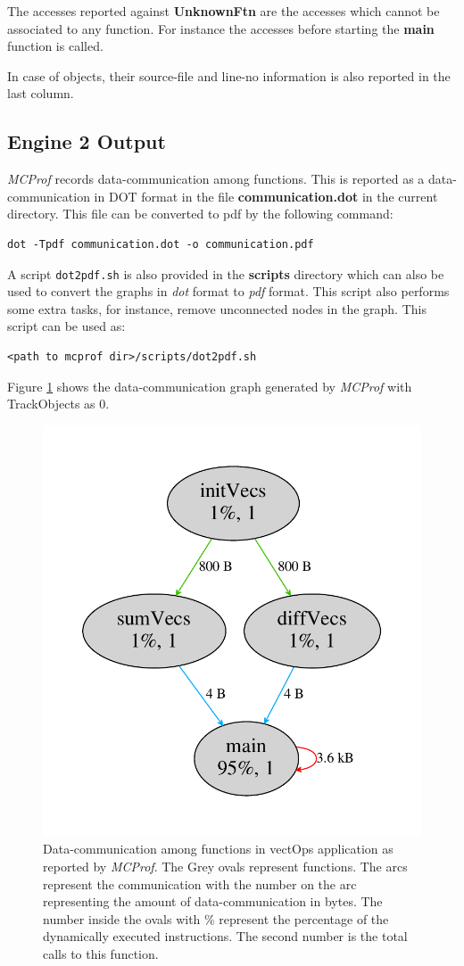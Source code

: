 \documentclass[11pt]{article}
\newcommand{\MCPROF}{\emph{MCProf}}
\begin{document}
The accesses reported against \textbf{UnknownFtn} are the accesses which cannot
be associated to any function. For instance the accesses before starting the
\textbf{main} function is called.

In case of objects, their source-file and line-no information is also reported in
the last column.

\subsection{Engine 2 Output}

\MCPROF{} records data-communication among functions. This is reported as a
data-communication in DOT format in the file \textbf{communication.dot} in the
current directory. This file can be converted to pdf by the following command:

{
\small
\begin{Verbatim}[frame=single]
dot -Tpdf communication.dot -o communication.pdf
\end{Verbatim}
}

A script \verb|dot2pdf.sh| is also provided in the \textbf{scripts} directory which can
also be used to convert the graphs in \emph{dot} format to \emph{pdf} format. This script
also performs some extra tasks, for instance, remove unconnected nodes in the
graph. This script can be used as:

{
\small
\begin{Verbatim}[frame=single]
<path to mcprof dir>/scripts/dot2pdf.sh
\end{Verbatim}
}

Figure \ref{fig:comm} shows the data-communication graph generated by \MCPROF{}
with TrackObjects as 0.

\begin{figure}[!h]
\centering
\includegraphics[width=0.55\linewidth]{figures/comm.pdf}
\caption{Data-communication among functions in vectOps application as reported
    by \MCPROF{}. The Grey ovals represent functions. The arcs represent the
    communication with the number on the arc representing the amount of
    data-communication in bytes. The number inside the ovals with \% represent
    the percentage of the dynamically executed instructions. The second number
    is the total calls to this function.}
\label{fig:comm}
\end{figure}
\end{document}
